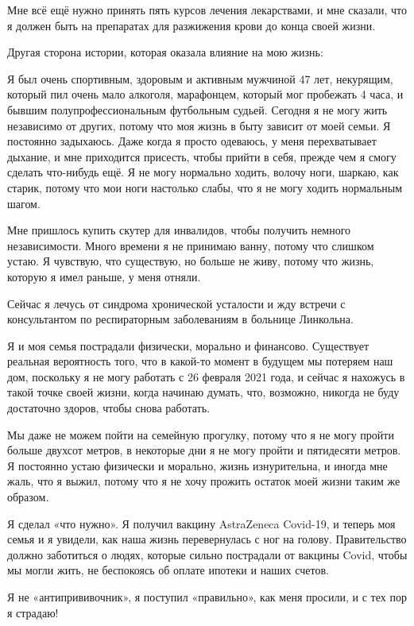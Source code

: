 Мне всё ещё нужно принять пять курсов лечения лекарствами, и мне сказали, что я
должен быть на препаратах для разжижения крови до конца своей жизни.

Другая сторона истории, которая оказала влияние на мою жизнь:

Я был очень спортивным, здоровым и активным мужчиной 47 лет, некурящим, который
пил очень мало алкоголя, марафонцем, который мог пробежать 4 часа, и бывшим
полупрофессиональным футбольным судьей. Сегодня я не могу жить независимо от
других, потому что моя жизнь в быту зависит от моей семьи. Я постоянно
задыхаюсь. Даже когда я просто одеваюсь, у меня перехватывает дыхание, и мне
приходится присесть, чтобы прийти в себя, прежде чем я смогу сделать что-нибудь
ещё. Я не могу нормально ходить, волочу ноги, шаркаю, как старик, потому что мои
ноги настолько слабы, что я не могу ходить нормальным шагом.

Мне пришлось купить скутер для инвалидов, чтобы получить немного
независимости. Много времени я не принимаю ванну, потому что слишком устаю. Я
чувствую, что существую, но больше не живу, потому что жизнь, которую я имел
раньше, у меня отняли.

Сейчас я лечусь от синдрома хронической усталости и жду встречи с консультантом
по респираторным заболеваниям в больнице Линкольна.

Я и моя семья пострадали физически, морально и финансово. Существует реальная
вероятность того, что в какой-то момент в будущем мы потеряем наш дом, поскольку
я не могу работать с 26 февраля 2021 года, и сейчас я нахожусь в такой точке
своей жизни, когда начинаю думать, что, возможно, никогда не буду достаточно
здоров, чтобы снова работать.

Мы даже не можем пойти на семейную прогулку, потому что я не могу пройти больше
двухсот метров, в некоторые дни я не могу пройти и пятидесяти метров. Я
постоянно устаю физически и морально, жизнь изнурительна, и иногда мне жаль, что
я выжил, потому что я не хочу прожить остаток моей жизни таким же образом.

Я сделал «что нужно». Я получил вакцину AstraZeneca Covid-19, и теперь моя семья
и я увидели, как наша жизнь перевернулась с ног на голову. Правительство должно
заботиться о людях, которые сильно пострадали от вакцины Covid, чтобы мы могли
жить, не беспокоясь об оплате ипотеки и наших счетов.

Я не «антипрививочник», я поступил «правильно», как меня просили, и с тех пор я
страдаю!
